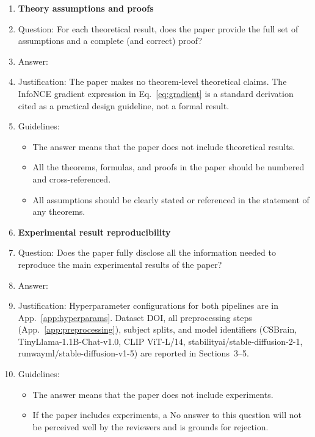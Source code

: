 \documentclass{article}
\begin{document}
\begin{enumerate}
\item {\bf Theory assumptions and proofs}
    \item[] Question: For each theoretical result, does the paper provide the full set of assumptions and a complete (and correct) proof?
    \item[] Answer: \answerNA{}
    \item[] Justification: The paper makes no theorem-level theoretical claims. The InfoNCE gradient expression in Eq.~\ref{eq:gradient} is a standard derivation cited as a practical design guideline, not a formal result.
    \item[] Guidelines:
    \begin{itemize}
        \item The answer \answerNA{} means that the paper does not include theoretical results.
        \item All the theorems, formulas, and proofs in the paper should be numbered and cross-referenced.
        \item All assumptions should be clearly stated or referenced in the statement of any theorems.
    \end{itemize}

\item {\bf Experimental result reproducibility}
    \item[] Question: Does the paper fully disclose all the information needed to reproduce the main experimental results of the paper?
    \item[] Answer: \answerYes{}
    \item[] Justification: Hyperparameter configurations for both pipelines are in App.~\ref{app:hyperparams}. Dataset DOI, all preprocessing steps (App.~\ref{app:preprocessing}), subject splits, and model identifiers (CSBrain, TinyLlama-1.1B-Chat-v1.0, CLIP ViT-L/14, stabilityai/stable-diffusion-2-1, runwayml/stable-diffusion-v1-5) are reported in Sections~3--5.
    \item[] Guidelines:
    \begin{itemize}
        \item The answer \answerNA{} means that the paper does not include experiments.
        \item If the paper includes experiments, a No answer to this question will not be perceived well by the reviewers and is grounds for rejection.
    \end{itemize}


\end{enumerate}
\end{document}
